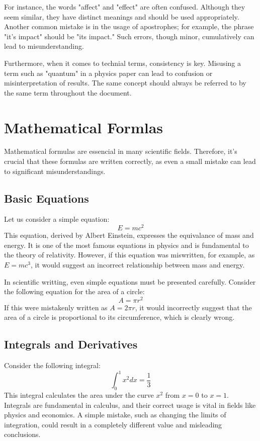 \documentclass{article}
\begin{document}
For instance, the words "affect" and "effect" are often confused. Although they seem similar, they have distinct meanings and should be used appropriately. Another common mistake is in the usage of apostrophes; for example, the phrase "it's impact" should be "its impact." Such errors, though minor, cumulatively can lead to misunderstanding.

Furthermore, when it comes to technial terms, consistency is key. Misusing a term such as "quantum" in a physics paper can lead to confusion or misinterpretation of results. The same concept should always be referred to by the same term throughout the document.

\section{Mathematical Formlas}
Mathematical formulas are essencial in many scientific fields. Therefore, it's crucial that these formulas are written correctly, as even a small mistake can lead to significant misunderstandings.

\subsection{Basic Equations}
Let us consider a simple equation:
\begin{equation}
    E = mc^2
\end{equation}
This equation, derived by Albert Einstein, expresses the equivalance of mass and energy. It is one of the most famous equations in physics and is fundamental to the theory of relativity. However, if this equation was miswritten, for example, as $E = mc^3$, it would suggest an incorrect relationship between mass and energy.

In scientific writting, even simple equations must be presented carefully. Consider the following equation for the area of a circle:
\begin{equation}
    A = \pi r^2
\end{equation}
If this were mistakenly written as $A = 2\pi r$, it would incorrectly suggest that the area of a circle is proportional to its circumference, which is clearly wrong.

\subsection{Integrals and Derivatives}
Consider the following integral:
\begin{equation}
    \int_0^1 x^2 dx = \frac{1}{3}
\end{equation}
This integral calculates the area under the curve $x^2$ from $x=0$ to $x=1$. Integrals are fundamental in calculus, and their correct usage is vital in fields like physics and economics. A simple mistake, such as changing the limits of integration, could result in a completely different value and misleading conclusions.
\end{document}
